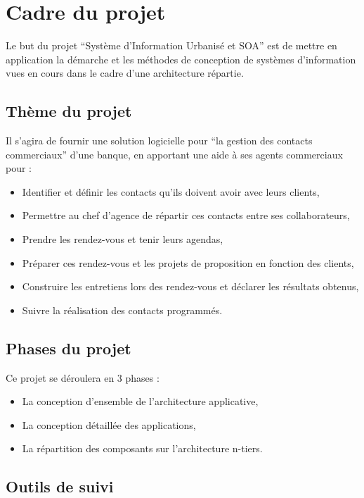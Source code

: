 
\section{Cadre du projet}

Le but du projet ``Système d'Information Urbanisé et SOA'' est de mettre en application la démarche et
les méthodes de conception de systèmes d'information vues en cours dans le cadre d'une architecture répartie.

\subsection{Thème du projet}

Il s'agira de fournir une solution logicielle pour ``la gestion des contacts commerciaux'' d'une banque,
en apportant une aide à ses agents commerciaux pour :

\begin{itemize}
\item Identifier et définir les contacts qu'ils doivent avoir avec leurs clients,
\item Permettre au chef d'agence de répartir ces contacts entre ses collaborateurs,
\item Prendre les rendez-vous et tenir leurs agendas,
\item Préparer ces rendez-vous et les projets de proposition en fonction des clients,
\item Construire les entretiens lors des rendez-vous et déclarer les résultats obtenus,
\item Suivre la réalisation des contacts programmés.
\end{itemize}

\subsection{Phases du projet}

Ce projet se déroulera en 3 phases :

\begin{itemize}
\item La conception d'ensemble de l'architecture applicative,
\item La conception détaillée des applications,
\item La répartition des composants sur l'architecture n-tiers.
\end{itemize}

\subsection{Outils de suivi}

